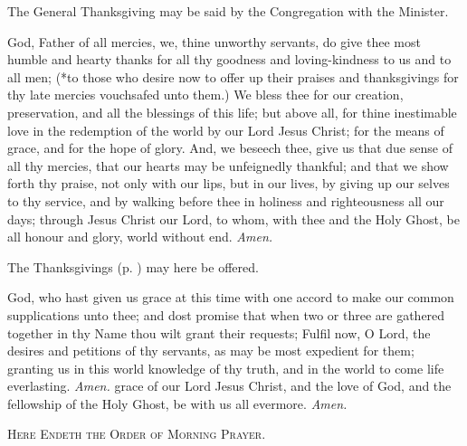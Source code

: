 \begin{rubric}
    The General Thanksgiving may be said by the Congregation with the Minister.
\end{rubric}
 God, Father of all mercies, we, thine unworthy servants, do give thee most humble and hearty thanks for all thy goodness and loving-kindness to us and to all men; (*to those who desire now to offer up their praises and thanksgivings for thy late mercies vouchsafed unto them.) We bless thee for our creation, preservation, and all the blessings of this life; but above all, for thine inestimable love in the redemption of the world by our Lord Jesus Christ; for the means of grace, and for the hope of glory. And, we beseech thee, give us that due sense of all thy mercies, that our hearts may be unfeignedly thankful; and that we show forth thy praise, not only with our lips, but in our lives, by giving up our selves to thy service, and by walking before thee in holiness and righteousness all our days; through Jesus Christ our Lord, to whom, with thee and the Holy Ghost, be all honour and glory, world without end. \textit{Amen.}
\begin{rubric}
    The Thanksgivings (p. \pageref{thanksgiving}) may here be offered.
\end{rubric}
\vspace{-2ex}
 God, who hast given us grace at this time with one accord to make our common supplications unto thee; and dost promise that when two or three are gathered together in thy Name thou wilt grant their requests; Fulfil now, O Lord, the desires and petitions of thy servants, as may be most expedient for them; granting us in this world knowledge of thy truth, and in the world to come life everlasting. \textit{Amen.}
 grace of our Lord Jesus Christ, {} and the love of God, and the fellowship of the Holy Ghost, be with us all evermore. \textit{Amen.}\par
\begin{center}
    \textsc{Here Endeth the Order of Morning Prayer.}
\end{center}